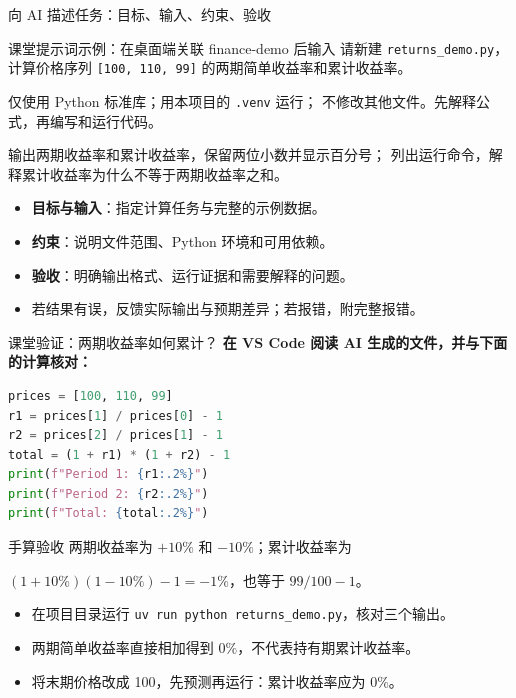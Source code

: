 \documentclass[9pt]{ctexbeamer}
\begin{document}
\begin{frame}{向 AI 描述任务：目标、输入、约束、验收}
  \begin{block}{课堂提示词示例：在桌面端关联 finance-demo 后输入}
    请新建 \texttt{returns\_demo.py}，计算价格序列
    \texttt{[100, 110, 99]} 的两期简单收益率和累计收益率。\par\medskip
    仅使用 Python 标准库；用本项目的 \texttt{.venv} 运行；
    不修改其他文件。先解释公式，再编写和运行代码。\par\medskip
    输出两期收益率和累计收益率，保留两位小数并显示百分号；
    列出运行命令，解释累计收益率为什么不等于两期收益率之和。
  \end{block}
  \begin{itemize}
    \item \textbf{目标与输入}：指定计算任务与完整的示例数据。
    \item \textbf{约束}：说明文件范围、Python 环境和可用依赖。
    \item \textbf{验收}：明确输出格式、运行证据和需要解释的问题。
    \item 若结果有误，反馈实际输出与预期差异；若报错，附完整报错。
  \end{itemize}
\end{frame}

\begin{frame}[fragile]{课堂验证：两期收益率如何累计？}
  \textbf{在 VS Code 阅读 AI 生成的文件，并与下面的计算核对：}
\begin{lstlisting}[language=Python,numbers=none]
prices = [100, 110, 99]
r1 = prices[1] / prices[0] - 1
r2 = prices[2] / prices[1] - 1
total = (1 + r1) * (1 + r2) - 1
print(f"Period 1: {r1:.2%}")
print(f"Period 2: {r2:.2%}")
print(f"Total: {total:.2%}")
\end{lstlisting}
  \begin{block}{手算验收}
    两期收益率为 $+10\%$ 和 $-10\%$；累计收益率为\par
    $(1+10\%)(1-10\%)-1=-1\%$，也等于 $99/100-1$。
  \end{block}
  \begin{itemize}
    \item 在项目目录运行 \texttt{uv run python returns\_demo.py}，核对三个输出。
    \item 两期简单收益率直接相加得到 $0\%$，不代表持有期累计收益率。
    \item 将末期价格改成 100，先预测再运行：累计收益率应为 $0\%$。
  \end{itemize}
\end{frame}
\end{document}
